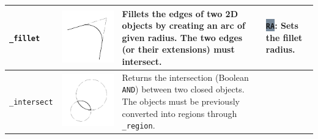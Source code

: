 \documentclass[..]{../IEEEphot}
\newcommand{\param}[1]{\colorbox{LightSlateGray}{\color{Navy}\texttt{\textbf{#1}}}}
\begin{document}
\begin{center}
\begin{longtable}{m{.2\linewidth}m{.2\linewidth}m{.25\linewidth}m{.25\linewidth}}
\\	
\midrule
\texttt{\_fillet} & \includegraphics[width = 0.8\linewidth, keepaspectratio]{../images/jpg/_fillet.jpg} & Fillets the edges of two 2D objects by creating an arc of given radius. The two edges (or their extensions) must intersect. & 
\param{RA}: Sets the fillet radius.
\\
\midrule
\texttt{\_intersect} & \includegraphics[width = 0.8\linewidth, keepaspectratio]{../images/jpg/_intersect.jpg} & Returns the intersection (Boolean \texttt{AND}) between two closed objects. The objects must be previously converted into regions through \texttt{\_region}. & 

\end{longtable}
\end{center}
\end{document}
